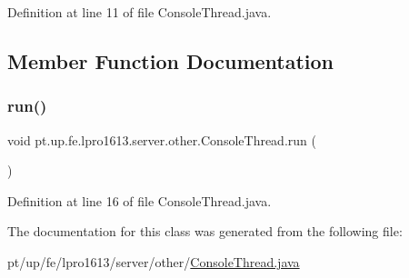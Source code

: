 Definition at line 11 of file Console\+Thread.\+java.



\subsection{Member Function Documentation}
\hypertarget{classpt_1_1up_1_1fe_1_1lpro1613_1_1server_1_1other_1_1_console_thread_a7740e1ce4d58dbe4cfcbf6caaa998290}{}\label{classpt_1_1up_1_1fe_1_1lpro1613_1_1server_1_1other_1_1_console_thread_a7740e1ce4d58dbe4cfcbf6caaa998290} 
\subsubsection{\texorpdfstring{run()}{run()}}
{\footnotesize\ttfamily void pt.\+up.\+fe.\+lpro1613.\+server.\+other.\+Console\+Thread.\+run (\begin{DoxyParamCaption}{ }\end{DoxyParamCaption})}



Definition at line 16 of file Console\+Thread.\+java.



The documentation for this class was generated from the following file\+:\begin{DoxyCompactItemize}
\item 
pt/up/fe/lpro1613/server/other/\hyperlink{_console_thread_8java}{Console\+Thread.\+java}\end{DoxyCompactItemize}

